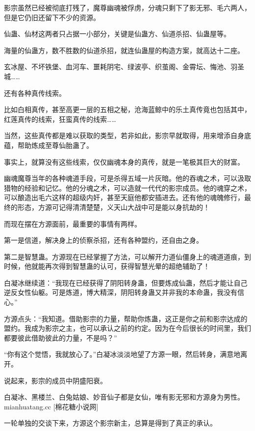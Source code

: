 
\begin{this_body}

影宗虽然已经被彻底打残了，魔尊幽魂被俘虏，分魂只剩下了影无邪、毛六两人，但是它仍旧还留下不少的资源。

仙蛊、仙材这两者只占据一小部分，关键是仙蛊方、仙道杀招、仙蛊屋等。

海量的仙蛊方，数不胜数的仙道杀招，就连仙蛊屋的构造方案，就高达十二座。

玄冰屋、不坏铁堡、血河车、噩耗阴宅、绿波亭、织茧阁、金霄坛、悔池、羽圣城……

还有各种真传线索。

比如白相真传，甚至高更一层的五相之秘，沧海蓝鲸中的乐土真传竟也包括其中，红莲真传的线索，狂蛮真传的线索……

当然，这些真传都是难以获取的类型，若非如此，影宗早就取得，用来增添自身底蕴，帮助炼成至尊仙胎蛊了。

事实上，就算没有这些线索，仅仅幽魂本身的真传，就是一笔极其巨大的财富。

幽魂魔尊当年的各种魂道手段，可是杀得五域一片灰暗。他的吞魂之术，可以汲取猎物的经验和记忆。他的分魂之术，可以造就一代代的影宗成员。他的魂穿之术，可以酿造出毛六这样的超级内奸，甚至天庭他都安插进去。还有他的魂魄修行，最终的形态，方源可记得清清楚楚，义天山大战中可是能以身抗劫的！

而现在摆在方源面前，最重要的事情有两样。

第一是信道，解决身上的侦察杀招，还有各种盟约，还自由之身。

第二是智慧蛊。方源现在已经掌握了方法，可以解开力道仙僵身上的魂道道痕，到时候，他就能再次得到智慧蛊的认可，获得智慧光晕的超绝辅助了！

白凝冰继续道：“我现在已经获得了阴阳转身蛊，但要炼成仙蛊，然后才能让自己逆反女性仙躯。可是炼道，博大精深，阴阳转身蛊又并非我的本命蛊，我没有信心。”

方源点头：“我知道。借助影宗的力量，帮助你炼蛊，这正是你之前和影宗达成的盟约。我成为影宗之主，也可以承认之前的约定。因为在今后很长的时间里，我们都要彼此借助彼此的力量，不是吗？”

“你有这个觉悟，我就放心了。”白凝冰淡淡地望了方源一眼，然后转身，满意地离开。

说起来，影宗的成员中阴盛阳衰。

白凝冰、黑楼兰、白兔姑娘、妙音仙子都是女仙，唯有影无邪和方源身为男性。mianhuatang.cc [棉花糖小说网]

一轮单独的交谈下来，方源这个影宗新主，总算是得到了真正的承认。


\end{this_body}
